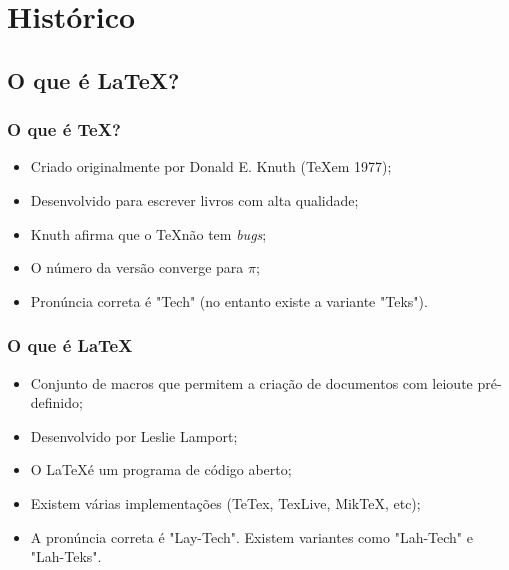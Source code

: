 \section{Hist\'orico}
\subsection{O que \'e \LaTeX?}


\begin{frame}
\frametitle{O que \'e \TeX?}

\begin{itemize}

\item Criado originalmente por Donald E. Knuth (\TeX em 1977);
\item Desenvolvido para escrever livros com alta qualidade;
\item Knuth afirma que o \TeX n\~ao tem \textit{bugs};
\item O n\'umero da vers\~ao converge para $\pi$;
\item Pron\'uncia correta \'e "Tech" (no entanto existe a variante "Teks").

\end{itemize}

\end{frame}


\begin{frame}
\frametitle{O que \'e \LaTeX}

\begin{itemize}

\item Conjunto de macros que permitem a cria{\c c}\~ao de documentos com leioute pr\'e-definido;
\item Desenvolvido por Leslie Lamport;
\item O \LaTeX \'e um programa de c\'odigo aberto;
\item Existem v\'arias implementa{\c c}\~oes (TeTex, TexLive, MikTeX, etc);
\item A pron\'uncia correta \'e "Lay-Tech". Existem variantes como "Lah-Tech" e "Lah-Teks".

\end{itemize}

\end{frame}

